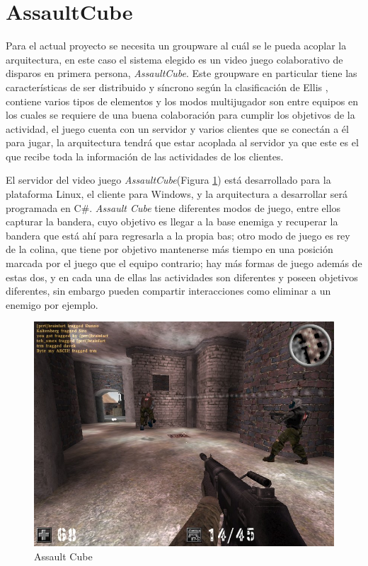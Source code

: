 \section{AssaultCube}
Para el actual proyecto se necesita un groupware al cu\'al se le pueda acoplar la arquitectura, en este caso el sistema elegido es un video juego colaborativo de disparos en primera persona, \textit{AssaultCube}. Este groupware en particular tiene las caracter\'isticas de ser distribuido y s\'incrono seg\'un la clasificaci\'on de Ellis  	\cite{ellis1991groupware}, contiene varios tipos de elementos y los modos multijugador son entre equipos en los cuales se requiere de una buena colaboraci\'on para cumplir los objetivos de la actividad, el juego cuenta con un servidor y varios clientes que se conect\'an a \'el para jugar, la arquitectura tendr\'a que estar acoplada al servidor ya que este es el que recibe toda la informaci\'on de las actividades de los clientes.

El servidor del video juego \textit{AssaultCube}(Figura \ref{gw:asscb}) est\'a desarrollado para la plataforma Linux, el cliente para Windows, y la arquitectura a desarrollar ser\'a programada en C\#. \textit{Assault Cube} tiene diferentes modos de juego, entre ellos capturar la bandera, cuyo objetivo es llegar a la base enemiga y recuperar la bandera que est\'a ah\'i para regresarla a la propia bas; otro modo de juego es rey de la colina, que tiene por objetivo mantenerse m\'as tiempo en una posici\'on marcada por el juego que el equipo contrario; hay m\'as formas de juego adem\'as de estas dos, y en cada una de ellas las actividades son diferentes y poseen objetivos diferentes, sin embargo pueden compartir interacciones como eliminar a un enemigo por ejemplo. 

\begin{figure}[h!]
\centering
\includegraphics[scale=.25]{images/assaultcube}
\caption{Assault Cube}
\label{gw:asscb}
\end{figure}

